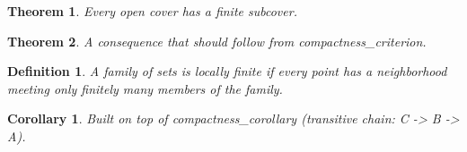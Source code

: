 \documentclass{article}
\newtheorem{theorem}{Theorem}
\newtheorem{corollary}{Corollary}
\newtheorem{definition}{Definition}
\begin{document}

\begin{theorem}\label{thm:compactness-criterion}
Every open cover has a finite subcover.
\end{theorem}

\begin{theorem}\label{thm:compactness-corollary}
A consequence that should follow from compactness\_criterion.
\end{theorem}

\begin{definition}\label{def:locally-finite}
A family of sets is locally finite if every point has a neighborhood
meeting only finitely many members of the family.
\end{definition}

\begin{corollary}\label{thm:heine-borel-application}
Built on top of compactness\_corollary (transitive chain: C -> B -> A).
\end{corollary}
\end{document}
